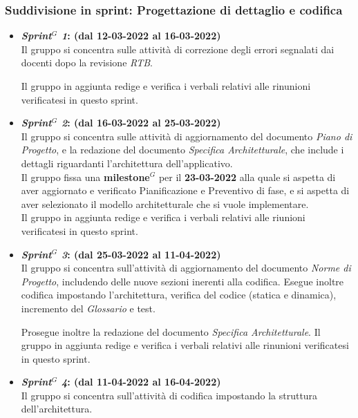 \subsubsection{Suddivisione in sprint: Progettazione di dettaglio e codifica}
\begin{itemize}
    \item \textbf{\textit{Sprint$^G$  1}: (dal 12-03-2022 al 16-03-2022)}\\
    Il gruppo si concentra sulle attività di correzione degli errori segnalati dai docenti dopo la revisione \textit{RTB}.
    
    Il gruppo in aggiunta redige e verifica i verbali relativi alle rinunioni verificatesi in questo sprint.

    \item \textbf{\textit{Sprint$^G$  2}: (dal 16-03-2022 al 25-03-2022)}\\
    Il gruppo si concentra sulle attività di aggiornamento del documento \textit{Piano di Progetto}, e la redazione del documento \textit{Specifica Architetturale}, che include i dettagli riguardanti l'architettura dell'applicativo.\\
    Il gruppo fissa una \textbf{milestone}$^G$  per il \textbf{23-03-2022} alla quale si aspetta di aver aggiornato e verificato Pianificazione e Preventivo di fase, e si aspetta di aver selezionato il modello architetturale che si vuole implementare.\\
    Il gruppo in aggiunta redige e verifica i verbali relativi alle riunioni verificatesi in questo sprint.

    \item \textbf{\textit{Sprint$^G$  3}: (dal 25-03-2022 al 11-04-2022)}\\
    Il gruppo si concentra sull'attività di aggiornamento del documento \textit{Norme di Progetto}, includendo delle nuove sezioni inerenti alla codifica. Esegue inoltre codifica impostando l'architettura, verifica del codice (statica e dinamica), incremento del \textit{Glossario} e test.

    Prosegue inoltre la redazione del documento \textit{Specifica Architetturale}. 
    Il gruppo in aggiunta redige e verifica i verbali relativi alle rinunioni verificatesi in questo sprint.

    \item \textbf{\textit{Sprint$^G$  4}: (dal 11-04-2022 al 16-04-2022)}\\
    Il gruppo si concentra sull'attività di codifica impostando la struttura dell'architettura. 


\end{itemize}
